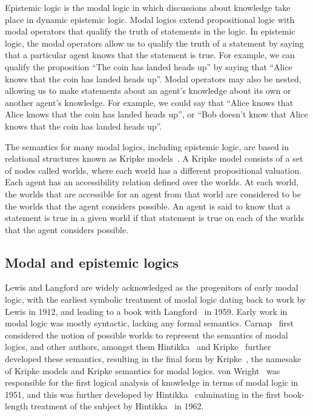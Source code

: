 Epistemic logic is the modal logic in which discussions about knowledge take place in dynamic epistemic logic.
Modal logics extend propositional logic with modal operators that qualify the truth of statements in the logic.
In epistemic logic, the modal operators allow us to qualify the truth of a statement by saying that a particular agent knows that the statement is true.
For example, we can qualify the proposition ``The coin has landed heads up'' by saying that ``Alice knows that the coin has landed heads up''.
Modal operators may also be nested, allowing us to make statements about an agent's knowledge about its own or another agent's knowledge.
For example, we could say that ``Alice knows that Alice knows that the coin has landed heads up'', or ``Bob doesn't know that Alice knows that the coin has landed heads up''.  

The semantics for many modal logics, including epistemic logic, are based in relational structures known as Kripke models~\cite{kripke:1963,blackburn:2001}.
A Kripke model consists of a set of nodes called worlds, where each world has a different propositional valuation.
Each agent has an accessibility relation defined over the worlds.
At each world, the worlds that are accessible for an agent from that world are considered to be the worlds that the agent considers possible.
An agent is said to know that a statement is true in a given world if that statement is true on each of the worlds that the agent considers possible.  

\subsection{Modal and epistemic logics}

Lewis and Langford are widely acknowledged as the progenitors of early modal logic, with the earliest symbolic treatment of modal logic dating back to work by Lewis in 1912, and leading to a book with Langford~\cite{langford:1959} in 1959.
Early work in modal logic was mostly syntactic, lacking any formal semantics.
Carnap~\cite{carnap:1946, carnap:1947} first considered the notion of possible worlds to represent the semantics of modal logics, and other authors, amongst them Hintikka~\cite{hintikka:1957, hintikka:1961} and Kripke~\cite{kripke:1959} further developed these semantics, resulting in the final form by Kripke~\cite{kripke:1963}, the namesake of Kripke models and Kripke semantics for modal logics.
von Wright~\cite{vonwright:1951} was responsible for the first logical analysis of knowledge in terms of modal logic in 1951, and this was further developed by Hintikka~\cite{hintikka:1957,hintikka:1961} culminating in the first book-length treatment of the subject by Hintikka~\cite{hintikka:1962} in 1962.

